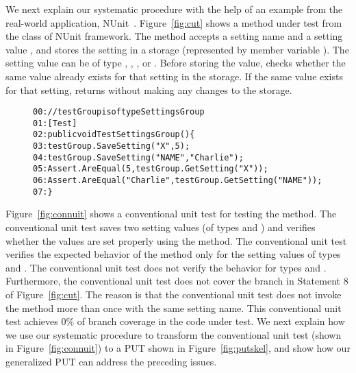 We next explain our systematic procedure with the help of an example from the real-world application, NUnit~\cite{nunit}. Figure~\ref{fig:cut} shows a method under test  from the  class of NUnit framework. The  method accepts a setting name  and a setting value , and stores the setting in a storage (represented by member variable ). The setting value can be of type , , , or . Before storing the value,  checks whether the same value already exists for that setting in the storage. If the same value exists for that setting,  returns without making any changes to the storage.

\begin{figure}[t]
\begin{CodeOut}
\begin{alltt}
00://testGroup is of type SettingsGroup
01:[Test]
02:public void TestSettingsGroup() \{
03:\hspace*{0.1in}testGroup.SaveSetting("X", 5);
04:\hspace*{0.1in}testGroup.SaveSetting("NAME", "Charlie");
05:\hspace*{0.1in}Assert.AreEqual(5, testGroup.GetSetting("X"));
06:\hspace*{0.1in}Assert.AreEqual("Charlie", testGroup.GetSetting("NAME"));
07:\}
\end{alltt}
\end{CodeOut}
\end{figure}

Figure~\ref{fig:connuit} shows a conventional unit test for testing the  method. The conventional unit test saves two setting values (of types  and ) and verifies whether the values are set properly using the  method. The conventional unit test verifies the expected behavior of the  method only for the setting values of types  and . The conventional unit test does not verify the behavior for types  and . Furthermore, the conventional unit test does not cover the  branch in Statement 8 of Figure~\ref{fig:cut}. The reason is that the conventional unit test does not invoke the  method more than once with the same setting name. This conventional unit test achieves $0$\% of branch coverage in the code under test. We next explain how we use our systematic procedure to transform the conventional unit test (shown in Figure~\ref{fig:connuit}) to a PUT shown in Figure~\ref{fig:putskel}, and show how our generalized PUT can address the preceding issues.

